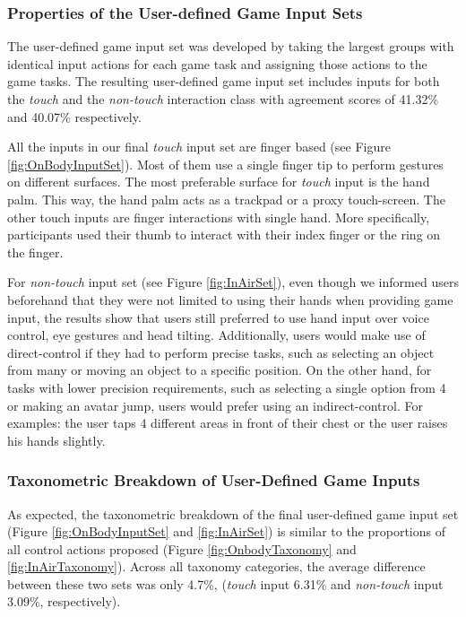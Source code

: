 \documentclass{sigchi}
\begin{document}
   \subsubsection{Properties of the User-defined Game Input Sets}
   The user-defined game input set was developed by taking the largest groups with identical input actions for each game task and assigning those actions to the game tasks. 
   The resulting user-defined game input set includes inputs for both the \emph{touch} and the \emph{non-touch} interaction class with agreement scores of 41.32\% and 40.07\% respectively. 

      All the inputs in our final \emph{touch} input set are finger based (see Figure \ref{fig:OnBodyInputSet}). Most of them use a single finger tip to perform gestures on different surfaces. The most preferable surface for \emph{touch} input is the hand palm. This way, the hand palm acts as a trackpad or a proxy touch-screen. The other touch inputs are finger interactions with single hand. More specifically, participants used their thumb to interact with their index finger or the ring on the finger.

   For \emph{non-touch} input set (see Figure \ref{fig:InAirSet}), even though we informed users beforehand that they were not limited to using their hands when providing game input, the results show that users still preferred to use hand input over voice control, eye gestures and head tilting. Additionally, users would make use of direct-control if they had to perform precise tasks, such as selecting an object from many or moving an object to a specific position. On the other hand, for tasks with lower precision requirements, such as selecting a single option from 4 or making an avatar jump, users would prefer using an indirect-control. For examples: the user taps 4 different areas in front of their chest or the user raises his hands slightly.


 

   \subsubsection{Taxonometric Breakdown of User-Defined Game Inputs}
   As expected, the taxonometric breakdown of the final user-defined game input set (Figure \ref{fig:OnBodyInputSet} and \ref{fig:InAirSet}) is similar to the proportions of all control actions proposed (Figure \ref{fig:OnbodyTaxonomy} and \ref{fig:InAirTaxonomy}). Across all taxonomy categories, the average difference between these two sets was only 4.7\%, (\emph{touch} input 6.31\% and \emph{non-touch} input 3.09\%, respectively).
\end{document}
